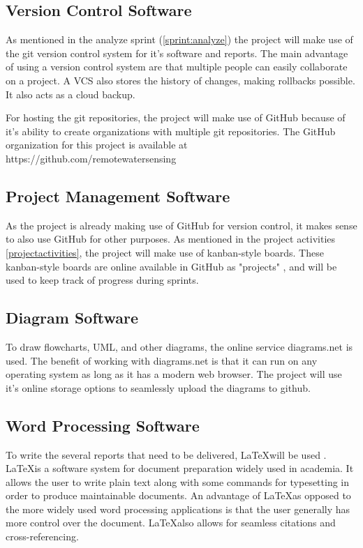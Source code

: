 \documentclass[11pt, a4paper]{article}
\begin{document}
\subsection{Version Control Software}
As mentioned in the analyze sprint (\ref{sprint:analyze}) the project will make use of the git version control system for it's software and reports. The main advantage of using a version control system are that multiple people can easily collaborate on a project. A VCS also stores the history of changes, making rollbacks possible. It also acts as a cloud backup.

For hosting the git repositories, the project will make use of GitHub \cite{gh} because of it's ability to create organizations with multiple git repositories. The GitHub organization for this project is available at https://github.com/remotewatersensing

\subsection{Project Management Software}
As the project is already making use of GitHub for version control, it makes sense to also use GitHub for other purposes. As mentioned in the project activities \ref{projectactivities}, the project will make use of kanban-style boards. These kanban-style boards are online available in GitHub as "projects" \cite{ghprojects}, and will be used to keep track of progress during sprints.

\subsection{Diagram Software}
To draw flowcharts, UML, and other diagrams, the online service diagrams.net \cite{diagrams} is used. The benefit of working with diagrams.net is that it can run on any operating system as long as it has a modern web browser. The project will use it's online storage options to seamlessly upload the diagrams to github.

\subsection{Word Processing Software}
To write the several reports that need to be delivered, \LaTeX will be used \cite{latex}. \LaTeX is a software system for document preparation widely used in academia. It allows the user to write plain text along with some commands for typesetting in order to produce maintainable documents. An advantage of \LaTeX as opposed to the more widely used word processing applications is that the user generally has more control over the document. \LaTeX also allows for seamless citations and cross-referencing.
\end{document}
